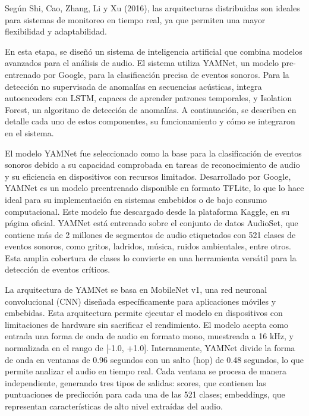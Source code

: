 
Según Shi, Cao, Zhang, Li y Xu (2016), las arquitecturas distribuidas son ideales para sistemas de monitoreo en tiempo real, ya que permiten una mayor flexibilidad y adaptabilidad.


En esta etapa, se diseñó un sistema de inteligencia artificial que combina modelos avanzados para el análisis de audio. El sistema utiliza YAMNet, un modelo pre-entrenado por Google, para la clasificación precisa de eventos sonoros. Para la detección no supervisada de anomalías en secuencias acústicas, integra autoencoders con LSTM, capaces de aprender patrones temporales, y Isolation Forest, un algoritmo de detección de anomalías. A continuación, se describen en detalle cada uno de estos componentes, su funcionamiento y cómo se integraron en el sistema.


El modelo YAMNet fue seleccionado como la base para la clasificación de eventos sonoros debido a su capacidad comprobada en tareas de reconocimiento de audio y su eficiencia en dispositivos con recursos limitados. Desarrollado por Google, YAMNet es un modelo preentrenado disponible en formato TFLite, lo que lo hace ideal para su implementación en sistemas embebidos o de bajo consumo computacional. Este modelo fue descargado desde la plataforma Kaggle, en su página oficial. YAMNet está entrenado sobre el conjunto de datos AudioSet, que contiene más de 2 millones de segmentos de audio etiquetados con 521 clases de eventos sonoros, como gritos, ladridos, música, ruidos ambientales, entre otros. Esta amplia cobertura de clases lo convierte en una herramienta versátil para la detección de eventos críticos.

La arquitectura de YAMNet se basa en MobileNet v1, una red neuronal convolucional (CNN) diseñada específicamente para aplicaciones móviles y embebidas. Esta arquitectura permite ejecutar el modelo en dispositivos con limitaciones de hardware sin sacrificar el rendimiento. El modelo acepta como entrada una forma de onda de audio en formato mono, muestreada a 16 kHz, y normalizada en el rango de [-1.0, +1.0]. Internamente, YAMNet divide la forma de onda en ventanas de 0.96 segundos con un salto (hop) de 0.48 segundos, lo que permite analizar el audio en tiempo real. Cada ventana se procesa de manera independiente, generando tres tipos de salidas: scores, que contienen las puntuaciones de predicción para cada una de las 521 clases; embeddings, que representan características de alto nivel extraídas del audio.

